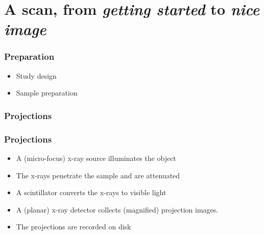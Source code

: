 \section{A scan, from \emph{getting started} to \emph{nice image}}
\begin{frame}
  \frametitle{Preparation}
  \begin{itemize}
    \item Study design
    \item Sample preparation
  \end{itemize}
\end{frame}

\begin{frame}
  \frametitle{Projections}
  \centering%
\end{frame}

\begin{frame}
  \frametitle{Projections}
  \begin{itemize}
    \item A (micro-focus) x-ray source illuminates the object
    \item The x-rays penetrate the sample and are attenuated
    \item A scintillator converts the x-rays to visible light
    \item A (planar) x-ray detector collects (magnified) projection images.
    \item The projections are recorded on disk
  \end{itemize}
\end{frame}

